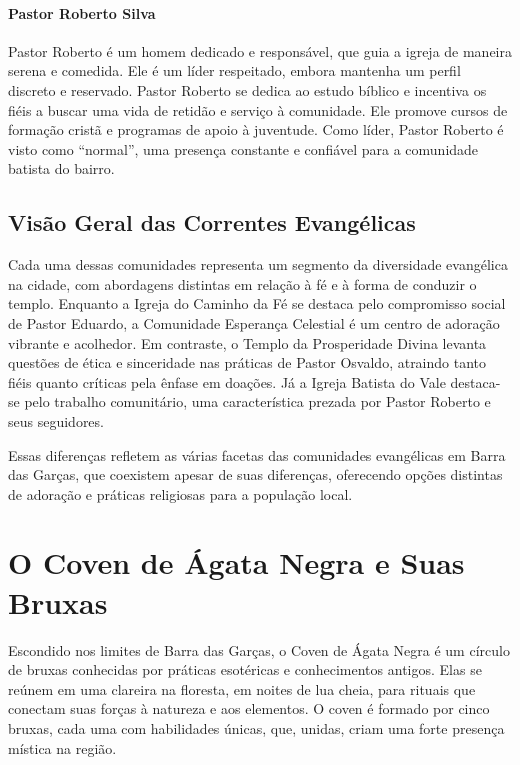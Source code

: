 \paragraph{Pastor Roberto Silva}  
Pastor Roberto é um homem dedicado e responsável, que guia a igreja de maneira serena e comedida. Ele é um líder respeitado, embora mantenha um perfil discreto e reservado. Pastor Roberto se dedica ao estudo bíblico e incentiva os fiéis a buscar uma vida de retidão e serviço à comunidade. Ele promove cursos de formação cristã e programas de apoio à juventude. Como líder, Pastor Roberto é visto como “normal”, uma presença constante e confiável para a comunidade batista do bairro.

\subsection{Visão Geral das Correntes Evangélicas}

Cada uma dessas comunidades representa um segmento da diversidade evangélica na cidade, com abordagens distintas em relação à fé e à forma de conduzir o templo. Enquanto a Igreja do Caminho da Fé se destaca pelo compromisso social de Pastor Eduardo, a Comunidade Esperança Celestial é um centro de adoração vibrante e acolhedor. Em contraste, o Templo da Prosperidade Divina levanta questões de ética e sinceridade nas práticas de Pastor Osvaldo, atraindo tanto fiéis quanto críticas pela ênfase em doações. Já a Igreja Batista do Vale destaca-se pelo trabalho comunitário, uma característica prezada por Pastor Roberto e seus seguidores.

Essas diferenças refletem as várias facetas das comunidades evangélicas em Barra das Garças, que coexistem apesar de suas diferenças, oferecendo opções distintas de adoração e práticas religiosas para a população local.

\section{O Coven de Ágata Negra e Suas Bruxas}

Escondido nos limites de Barra das Garças, o Coven de Ágata Negra é um círculo de bruxas conhecidas por práticas esotéricas e conhecimentos antigos. Elas se reúnem em uma clareira na floresta, em noites de lua cheia, para rituais que conectam suas forças à natureza e aos elementos. O coven é formado por cinco bruxas, cada uma com habilidades únicas, que, unidas, criam uma forte presença mística na região.

